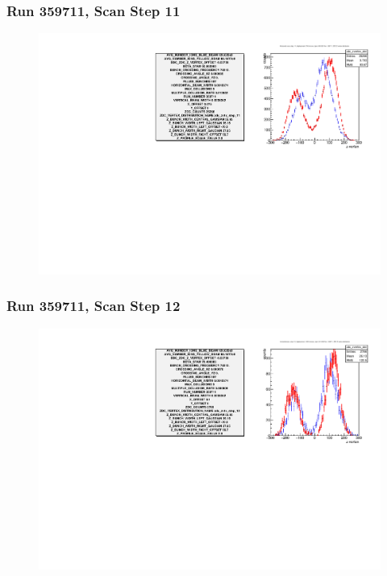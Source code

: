 \begin{frame}
\frametitle{Run 359711, Scan Step 11}
\begin{figure}
\begin{center}
\includegraphics[width=\linewidth]{"figs/359711_step_11_zdc_zvertex"}
\caption{ }
\label{fig:359711_step_11_zdc_zvertex}
\end{center}\end{figure}
\end{frame}

\begin{frame}
\frametitle{Run 359711, Scan Step 12}
\begin{figure}
\begin{center}
\includegraphics[width=\linewidth]{"figs/359711_step_12_zdc_zvertex"}
\caption{ }
\label{fig:359711_step_12_zdc_zvertex}
\end{center}\end{figure}
\end{frame}

